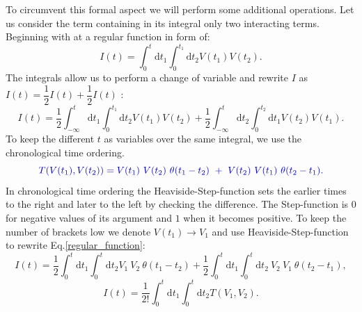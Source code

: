 \documentclass[12pt, titlepage]{article}
\begin{document}
To circumvent this formal aspect we will perform some additional operations.
Let us consider the term containing in its integral only two interacting terms. Beginning  with at a regular function in form of:\\
\begin{equation}\label{regular_function}
I(t)=
\int_{0}^{t}\mathrm{d}t_1\int_{0}^{t_1}\! \! \mathrm{d}t_2
V(t_1)V(t_2)
.
\end{equation}
The integrals allow us to perform a change of variable and rewrite $I$ as $ I(t) = \dfrac{1}{2} I(t) +\dfrac{1}{2} I(t)$ :\\
\begin{equation}
I(t)=
\dfrac{1}{2}
	\int_{-\infty}^{t}\mathrm{d}t_1\int_{0}^{t_1}\! \! \mathrm{d}t_2
			V(t_1)V(t_2)
+
\dfrac{1}{2}
	\int_{-\infty}^{t}\mathrm{d}t_2\int_{0}^{t_2}\! \! \mathrm{d}t_1
			V(t_2)V(t_1).
\end{equation}
To keep the different $ t $ as variables over the same integral, we use the chronological time ordering.
\begin{equation}\label{eq:chron-time_ordering}
\textcolor[RGB]{0,0,204}{
T(V(t_1), V(t_2))=V(t_1)\ V(t_2)\ \theta (t_1 -t_2)\ +\ V(t_2)\  V(t_1) \ \theta (t_2-t_1)
.}
\end{equation}
In chronological time ordering the Heaviside-Step-function sets the earlier times to the right and later to the left by checking the difference. The Step-function is $ 0 $ for negative values of its argument and $ 1 $ when it becomes positive.
To keep the number of brackets low we denote $ V(t_{1}) \rightarrow V_{1} $ 
and use Heaviside-Step-function to rewrite Eq.\enskip\eqref{regular_function}:
\begin{equation}
I(t)=\dfrac{1}{2}
\int_{0}^{t}\mathrm{d}t_1\int_{0}^{t}\! \! \mathrm{d}t_2
V_1\ V_2\ \theta (t_1 -t_2)
+
\dfrac{1}{2}
\int_{0}^{t}\mathrm{d}t_1\int_{0}^{t}\! \! \mathrm{d}t_2
\ V_2\  V_1 \ \theta (t_2-t_1)
,
\end{equation}
\begin{equation}
I(t)=\dfrac{1}{2!}
\int_{0}^{t}\mathrm{d}t_1\int_{0}^{t}\! \! \mathrm{d}t_2
T(V_1,V_2)
.
\end{equation}
\end{document}
